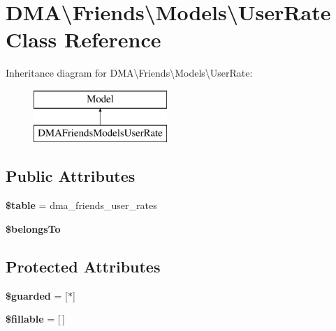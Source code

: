 \hypertarget{classDMA_1_1Friends_1_1Models_1_1UserRate}{}\section{D\+M\+A\textbackslash{}Friends\textbackslash{}Models\textbackslash{}User\+Rate Class Reference}
\label{classDMA_1_1Friends_1_1Models_1_1UserRate}
Inheritance diagram for D\+M\+A\textbackslash{}Friends\textbackslash{}Models\textbackslash{}User\+Rate\+:\begin{figure}[H]
\begin{center}
\leavevmode
\includegraphics[height=2.000000cm]{da/d23/classDMA_1_1Friends_1_1Models_1_1UserRate}
\end{center}
\end{figure}
\subsection*{Public Attributes}
\begin{DoxyCompactItemize}
\item 
\hypertarget{classDMA_1_1Friends_1_1Models_1_1UserRate_a2e9b3e7645e1b5a415ef12760d45373a}{}{\bfseries \$table} = \textquotesingle{}dma\+\_\+friends\+\_\+user\+\_\+rates\textquotesingle{}\label{classDMA_1_1Friends_1_1Models_1_1UserRate_a2e9b3e7645e1b5a415ef12760d45373a}

\item 
{\bfseries \$belongs\+To}
\end{DoxyCompactItemize}
\subsection*{Protected Attributes}
\begin{DoxyCompactItemize}
\item 
\hypertarget{classDMA_1_1Friends_1_1Models_1_1UserRate_a262fdb4d562f5a3ed9d183c437ea118a}{}{\bfseries \$guarded} = \mbox{[}\textquotesingle{}$\ast$\textquotesingle{}\mbox{]}\label{classDMA_1_1Friends_1_1Models_1_1UserRate_a262fdb4d562f5a3ed9d183c437ea118a}

\item 
\hypertarget{classDMA_1_1Friends_1_1Models_1_1UserRate_af721627d0e74cac826ee6a515e23531c}{}{\bfseries \$fillable} = \mbox{[}$\,$\mbox{]}\label{classDMA_1_1Friends_1_1Models_1_1UserRate_af721627d0e74cac826ee6a515e23531c}

\end{DoxyCompactItemize}


